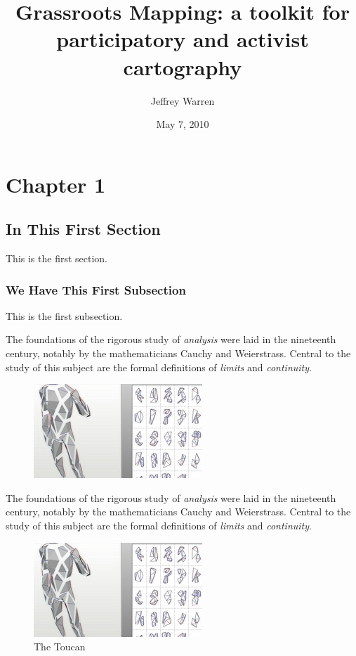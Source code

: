 \documentclass[11pt]{report}
\title{Grassroots Mapping: a toolkit for participatory and activist cartography}
\author{Jeffrey Warren}
\date{May 7, 2010}
\begin{document}
\maketitle

\chapter{Chapter 1}

\section{In This First Section}

This is the first section.

\subsection{We Have This First Subsection}

This is the first subsection.

The foundations of the rigorous study of \emph{analysis} were laid in the nineteenth century, notably by the mathematicians Cauchy and Weierstrass. Central to the study of this subject are the formal definitions of \emph{limits} and \emph{continuity}.

\begin{figure}[h]
\includegraphics[scale=0.75]{images/test.jpg}
\end{figure}

The foundations of the rigorous study of \emph{analysis} were laid in the nineteenth century, notably by the mathematicians Cauchy and Weierstrass. Central to the study of this subject are the formal definitions of \emph{limits} and \emph{continuity}.

\begin{figure}
  \includegraphics[scale=0.75]{images/test.jpg}
  \caption{The Toucan}
\end{figure}
\end{document}
